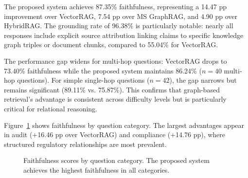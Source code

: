 \documentclass[review]{elsarticle}
\begin{document}
The proposed system achieves 87.35\% faithfulness, representing a 14.47 pp improvement over VectorRAG, 7.54 pp over MS GraphRAG, and 4.90 pp over HybridRAG. The grounding rate of 96.38\% is particularly notable: nearly all responses include explicit source attribution linking claims to specific knowledge graph triples or document chunks, compared to 55.04\% for VectorRAG.

The performance gap widens for multi-hop questions: VectorRAG drops to 73.40\% faithfulness while the proposed system maintains 86.24\% ($n=40$ multi-hop questions). For simple single-hop questions ($n=42$), the gap narrows but remains significant (89.11\% vs. 75.87\%). This confirms that graph-based retrieval's advantage is consistent across difficulty levels but is particularly critical for relational reasoning.

Figure~\ref{fig:faithfulness-category} shows faithfulness by question category. The largest advantages appear in audit (+16.46 pp over VectorRAG) and compliance (+14.76 pp), where structured regulatory relationships are most prevalent.

\begin{figure}[t]
\centering
{}
\caption{Faithfulness scores by question category. The proposed system achieves the highest faithfulness in all categories.}
\label{fig:faithfulness-category}
\end{figure}
\end{document}
